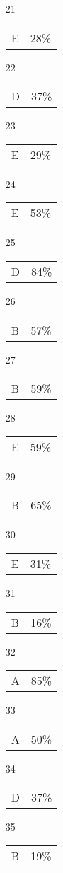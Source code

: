 \documentclass[12pt]{article}
\begin{document}
\begin{multicols}{5}
\begin{enumerate}
\item[21] \begin{tabular}{cc} E & 28\%\end{tabular}
\item[22] \begin{tabular}{cc} D & 37\%\end{tabular}
\item[23] \begin{tabular}{cc} E & 29\%\end{tabular}
\item[24] \begin{tabular}{cc} E & 53\%\end{tabular}
\item[25] \begin{tabular}{cc} D & 84\%\end{tabular}
\item[]
\item[26] \begin{tabular}{cc} B & 57\%\end{tabular}
\item[27] \begin{tabular}{cc} B & 59\%\end{tabular}
\item[28] \begin{tabular}{cc} E & 59\%\end{tabular}
\item[29] \begin{tabular}{cc} B & 65\%\end{tabular}
\item[30] \begin{tabular}{cc} E & 31\%\end{tabular}
\item[]
\item[31] \begin{tabular}{cc} B & 16\%\end{tabular}
\item[32] \begin{tabular}{cc} A & 85\%\end{tabular}
\item[33] \begin{tabular}{cc} A & 50\%\end{tabular}
\item[34] \begin{tabular}{cc} D & 37\%\end{tabular}
\item[35] \begin{tabular}{cc} B & 19\%\end{tabular}

\end{enumerate}
\end{multicols}
\end{document}
